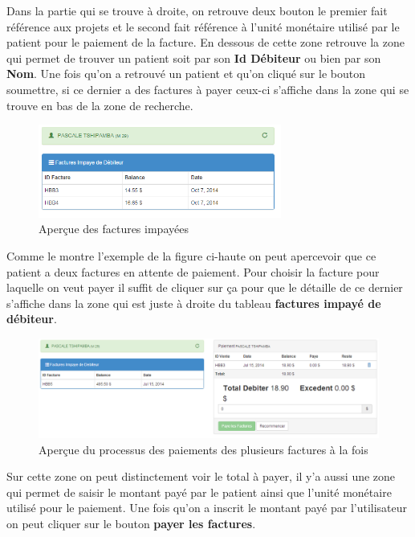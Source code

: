 \documentclass[12pt,a4paper]{report}
\begin{document}
Dans la partie qui se trouve à droite, on retrouve deux bouton le premier fait référence aux projets et le second fait référence à l'unité monétaire utilisé par le patient pour le paiement de la facture. En dessous de cette zone retrouve la zone qui permet de trouver un patient soit par son \textbf{Id Débiteur} ou bien par son \textbf{Nom}. 
Une fois qu'on a retrouvé un patient et qu'on cliqué sur le bouton soumettre, si ce dernier a des factures à payer ceux-ci s'affiche dans la zone qui se trouve en bas de la zone de recherche. 

\begin{figure}[h]
\begin{center}
\includegraphics[width=8cm]{pic/ViewInvoice.png}
\end{center}
\caption{Aperçue des factures impayées}
\label{Aperçue des factures impayées}
\end{figure}

Comme le montre l'exemple de la figure ci-haute on peut apercevoir que ce patient a deux factures en attente de paiement. Pour choisir la facture pour laquelle on veut payer il suffit de cliquer sur ça pour que le détaille de ce dernier s'affiche dans la zone qui est juste à droite du tableau \textbf{factures impayé de débiteur}.



\begin{figure}[h]
\begin{center}
\includegraphics[width=14cm]{pic/PaidInvoice.png}
\end{center}
\caption{Aperçue du processus des paiements des plusieurs factures à la fois}
\label{Aperçue du processus des paiements des plusieurs factures à la fois}
\end{figure}

Sur cette zone on peut distinctement voir le total à payer, il y'a aussi une zone qui permet de saisir le montant payé par le patient ainsi que l'unité monétaire utilisé pour  le paiement. Une fois qu'on a inscrit le montant payé par l'utilisateur on peut cliquer sur le bouton \textbf{payer les factures}.
\end{document}
